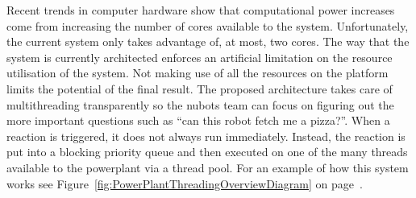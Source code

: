 \documentclass[english,12pt]{scrartcl}
\begin{document}
			Recent trends in computer hardware show that computational power increases come from increasing the number of cores available to the system.
			Unfortunately, the current system only takes advantage of, at most, two cores.
			The way that the system is currently architected enforces an artificial limitation on the resource utilisation of the system. Not making use of all the resources on the platform limits the potential of the final result.
			The proposed architecture takes care of multithreading transparently so the \gls{nubots} team can focus on figuring out the more important questions such as ``can this robot fetch me a pizza?''.
			When a \gls{reaction} is triggered, it does not always run immediately.
			Instead, the \gls{reaction} is put into a blocking priority queue and then executed on one of the many threads available to the \gls{powerplant} via a thread pool.
			For an example of how this system works see Figure~\ref{fig:PowerPlantThreadingOverviewDiagram} on page~\pageref{fig:PowerPlantThreadingOverviewDiagram}.
\end{document}
